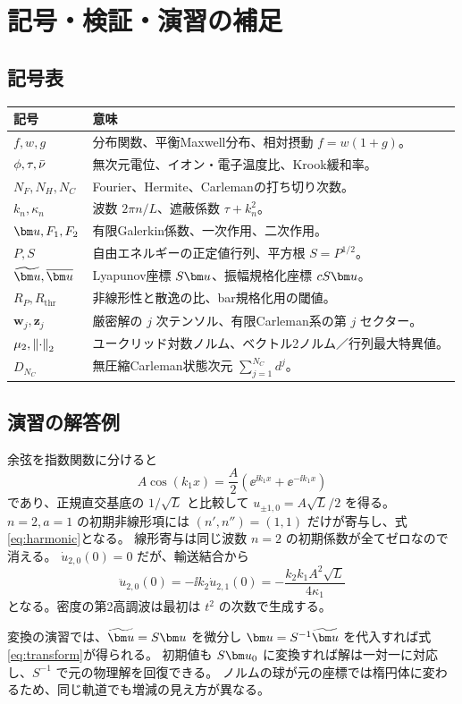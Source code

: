 \chapter{記号・検証・演習の補足}
\section{記号表}
\par\noindent
\begin{tabularx}{\textwidth}{lX}
\toprule 記号 & 意味 \\\midrule
$f,w,g$ & 分布関数、平衡Maxwell分布、相対摂動 $f=w(1+g)$。\\
$\phi,\tau,\bar\nu$ & 無次元電位、イオン・電子温度比、Krook緩和率。\\
$N_F,N_H,N_C$ & Fourier、Hermite、Carlemanの打ち切り次数。\\
$k_n,\kappa_n$ & 波数 $2\pi n/L$、遮蔽係数 $\tau+k_n^2$。\\
$\uu,F_1,F_2$ & 有限Galerkin係数、一次作用、二次作用。\\
$P,S$ & 自由エネルギーの正定値行列、平方根 $S=P^{1/2}$。\\
$\tu,\bu$ & Lyapunov座標 $S\uu$、振幅規格化座標 $cS\uu$。\\
$R_P,R_{\mathrm{thr}}$ & 非線形性と散逸の比、bar規格化用の閾値。\\
$\bm w_j,\bm z_j$ & 厳密解の $j$ 次テンソル、有限Carleman系の第 $j$ セクター。\\
$\mu_2,\left\lVert \cdot\right\rVert_2$ & ユークリッド対数ノルム、ベクトル2ノルム／行列最大特異値。\\
$D_{N_C}$ & 無圧縮Carleman状態次元 $\sum_{j=1}^{N_C}d^j$。\\
\bottomrule
\end{tabularx}

\section{演習の解答例}
余弦を指数関数に分けると
\[
A\cos(k_1x)=\frac A2(\ee^{\ii k_1x}+\ee^{-\ii k_1x})
\]
であり、正規直交基底の $1/\sqrt L$ と比較して $u_{\pm1,0}=A\sqrt L/2$ を得る。
$n=2,a=1$ の初期非線形項には $(n',n'')=(1,1)$ だけが寄与し、式\eqref{eq:harmonic}となる。
線形寄与は同じ波数 $n=2$ の初期係数が全てゼロなので消える。
$\dot u_{2,0}(0)=0$ だが、輸送結合から
\[
\ddot u_{2,0}(0)=-\ii k_2\dot u_{2,1}(0)
=-\frac{k_2k_1A^2\sqrt L}{4\kappa_1}
\]
となる。密度の第2高調波は最初は $t^2$ の次数で生成する。

変換の演習では、$\tu=S\uu$ を微分し $\uu=S^{-1}\tu$ を代入すれば式\eqref{eq:transform}が得られる。
初期値も $S\uu_0$ に変換すれば解は一対一に対応し、$S^{-1}$ で元の物理解を回復できる。
ノルムの球が元の座標では楕円体に変わるため、同じ軌道でも増減の見え方が異なる。

